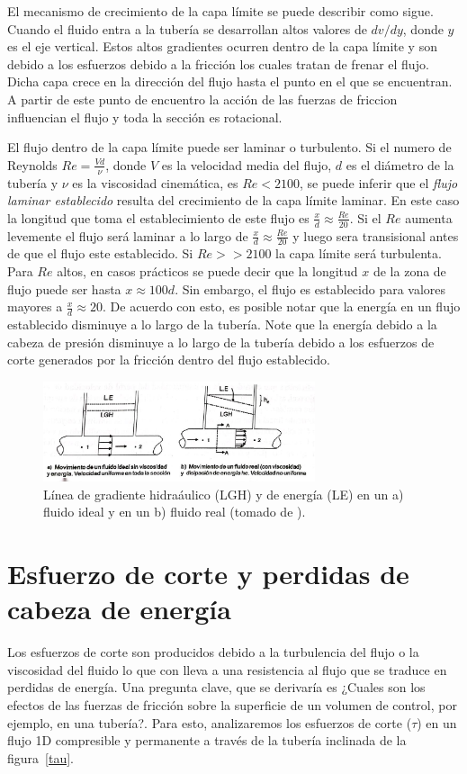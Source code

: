 \documentclass[11pt, oneside]{article}
\begin{document}
El mecanismo de crecimiento de la capa l\'imite se puede describir como sigue. Cuando el fluido entra a la tuber\'ia se desarrollan altos valores de $dv/dy$, donde $y$ es el eje vertical. Estos altos gradientes ocurren dentro de la capa l\'imite y son debido a los esfuerzos debido a la fricci\'on los cuales tratan de frenar el flujo. Dicha capa crece en la direcci\'on del flujo hasta el punto en el que se encuentran. A partir de este punto de encuentro la acci\'on de las fuerzas de friccion influencian el flujo y toda la secci\'on es rotacional.

El flujo dentro de la capa l\'imite puede ser laminar o turbulento. Si el numero de Reynolds $Re = \frac{Vd}{\nu}$, donde $V$ es la velocidad media del flujo, $d$ es el di\'ametro de la tuber\'ia y $\nu$ es la viscosidad cinem\'atica, es $Re < 2100$, se puede inferir que el \emph{flujo laminar establecido} resulta del crecimiento de la capa l\'imite laminar. En este caso la longitud que toma el establecimiento de este flujo es $\frac{x}{d} \approx \frac{Re}{20}$. Si el $Re$ aumenta levemente el flujo ser\'a laminar a lo largo de $\frac{x}{d} \approx \frac{Re}{20}$ y luego sera transisional antes de que el flujo este establecido. Si $Re >> 2100$ la capa l\'imite ser\'a turbulenta. Para $Re$ altos, en casos pr\'acticos se puede decir que la longitud $x$ de la zona de flujo puede ser hasta $x \approx 100 d$. Sin embargo, el flujo es establecido para valores mayores a $\frac{x}{d} \approx 20$. De acuerdo con esto, es posible notar que la energ\'ia en un flujo establecido disminuye a lo largo de la tuber\'ia. Note que la energ\'ia debido a la cabeza de presi\'on disminuye a lo largo de la tuber\'ia debido a los esfuerzos de corte generados por la fricci\'on dentro del flujo establecido. 
  
\begin{figure}[h]
\centering
\includegraphics[width=8cm]{fifr.jpeg}
\caption{L\'inea de gradiente hidra\'aulico (LGH) y de energ\'ia (LE) en un a) fluido ideal y en un b) fluido real (tomado de \cite{agudelo2011mecanica}).}
\label{fifr}
\end{figure}

\section{Esfuerzo de corte y perdidas de cabeza de energ\'ia} %
Los esfuerzos de corte son producidos debido a la turbulencia del flujo o la viscosidad del fluido lo que con lleva a una resistencia al flujo que se traduce en perdidas de energ\'ia. Una pregunta clave, que se derivar\'ia es ¿Cuales son los efectos de las fuerzas de fricci\'on sobre la superficie de un volumen de control, por ejemplo,  en una tuber\'ia?. Para esto, analizaremos los esfuerzos de corte ($\tau$) en un  flujo 1D compresible y permanente a trav\'es de la tuber\'ia inclinada de la figura~\ref{tau}.
   
\end{document}
